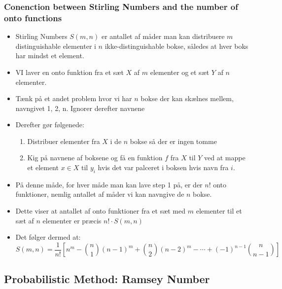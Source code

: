 \documentclass{beamer}
\begin{document}
\begin{frame}[allowframebreaks]
  \frametitle{Conenction between Stirling Numbers and the number of onto functions}
  \begin{itemize}
  \item Stirling Numbers $S(m,n)$ er antallet af måder man kan distribuere $m$ distinguishable elementer i $n$ ikke-distinguishable bokse, således at hver boks har mindst et element. 
  \item VI laver en onto funktion fra et sæt $X$ af $m$ elementer og et sæt $Y$ af $n$ elementer. 
  \item Tænk på et andet problem hvor vi har $n$ bokse der kan skælnes mellem, navngivet 1, 2, n. Ignorer derefter navnene
  \item Derefter gør følgenede: 
    
    \begin{enumerate}
    \item Distribuer elementer fra $X$ i de $n$ bokse så der er ingen tomme
    \item Kig på navnene af boksene og få en funktion $f$ fra $X$ til $Y$ ved at mappe et element $x \in X$ til $y_{i}$ hvis det var palceret i boksen hvis navn fra $i$. 
    \end{enumerate}
    \item På denne måde, for hver måde man kan lave step 1 på, er der $n!$ onto funktioner, nemlig antallet af måder vi kan navngive de $n$ bokse. 
    \item Dette viser at antallet af onto funktioner fra et sæt med $m$ elementer til et sæt af $n$ elementer er præcis $n! \cdot S(m,n)$
    \item Det følger dermed at:
    \[ S(m,n) = \frac{1}{n!} \left[ n^{m} - \binom{n}{1}(n-1)^{m} + \binom{n}{2}(n-2)^{m} - \cdots + (-1)^{n-1} \binom{n}{n-1} \right] \]
  \end{itemize}
\end{frame}

\subsection{Probabilistic Method: Ramsey Number}
\label{subsec:ramsey}
\end{document}
